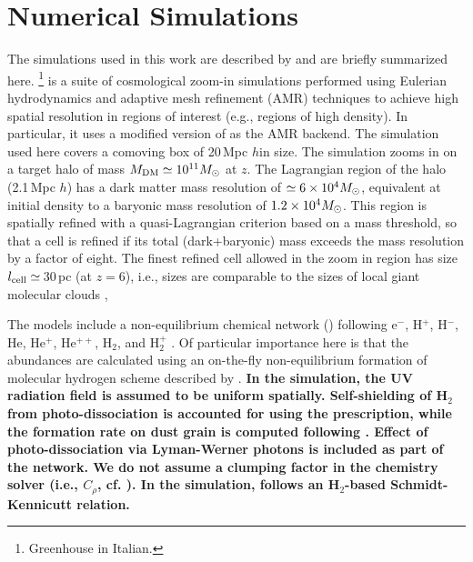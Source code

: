 \IfFileExists{emulateapjlegacy.cls}{\documentclass[iop]{emulateapjlegacy}}{\documentclass[iop]{emulateapj}}
\begin{document}
\section{Numerical Simulations}\label{sec:sim}
The simulations used in this work are described by \citet{Pallottini17a, Pallottini17b} and are briefly summarized here.
%
\footnote{Greenhouse in Italian.} is a suite of cosmological zoom-in simulations performed using Eulerian hydrodynamics and adaptive mesh refinement (AMR) techniques to achieve high spatial resolution in regions of interest (e.g., regions of high density).
%
In particular, it uses a modified version of  \citep{Teyssier02a} as the AMR backend. The simulation used here covers a comoving box of 20\,Mpc $h$\pmOne in size. The simulation zooms in on a target halo of mass $M_{\rm DM}\simeq10^{11} \mbox{$M_{\odot}$}$
at {\bf $z$}. The Lagrangian region of the halo (2.1\,Mpc $h$\pmOne) has a dark matter mass resolution of $\simeq 6\times 10^4 \mbox{$M_{\odot}$}$, equivalent at initial density to a baryonic mass resolution of $1.2 \times 10^4 \mbox{$M_{\odot}$}$. This region is spatially refined with a quasi-Lagrangian criterion based on a mass threshold, so that a cell is refined if its total (dark+baryonic) mass exceeds the mass resolution by a factor of eight. The finest refined cell allowed in the zoom in region has size $l_{\rm cell}\simeq$\,30\,pc (at $z = 6$), i.e., sizes are comparable to the sizes of local giant molecular clouds \citep[e.g.,][]{Sanders85a, Federrath13a, Goodman14a},

The models include a non-equilibrium chemical network () following e$^{-}$, H$^+$, H$^-$, He, He$^+$, He$^{++}$, H$_2$, 
and H$_2^+$ \citep{Grassi14a,Bovino16a}. Of particular importance here is that the abundances are calculated using an on-the-fly non-equilibrium 
formation of molecular hydrogen scheme described by \citet{Pallottini17a}. 
{\bf In the simulation, the UV radiation field is assumed to be uniform spatially. 
Self-shielding of H$_2$ from photo-dissociation is accounted for using the \citet{Richings14a} prescription, 
while the formation rate on dust grain is computed following \citet{Jura75a}. Effect of photo-dissociation via Lyman-Werner photons is included as 
part of the  network. %
We do not assume a clumping factor in the chemistry solver (i.e., $C_\rho$, cf. \citealt[][]{Lupi20a}).
In the simulation, \SF follows an H$_2$-based Schmidt-Kennicutt relation.}
\end{document}
